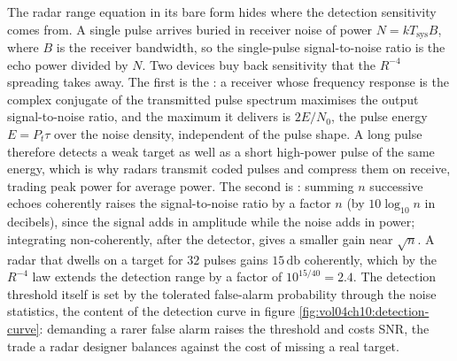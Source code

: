 \begin{mastery}
The radar range equation in its bare form hides where the detection
sensitivity comes from. A single pulse arrives buried in receiver noise
of power $N = k T_{\mathrm{sys}} B$, where $B$ is the receiver bandwidth,
so the single-pulse signal-to-noise ratio is the echo power divided by
$N$. Two devices buy back sensitivity that the $R^{-4}$ spreading takes
away. The first is the : a receiver whose
frequency response is the complex conjugate of the transmitted pulse
spectrum maximises the output signal-to-noise ratio, and the maximum it
delivers is $2E/N_{0}$, the pulse energy $E = P_{t}\tau$ over the noise
density, independent of the pulse shape. A long pulse therefore detects a
weak target as well as a short high-power pulse of the same energy, which
is why radars transmit coded pulses and compress them on receive, trading
peak power for average power. The second is :
summing $n$ successive echoes coherently raises the signal-to-noise ratio
by a factor $n$ (by $10\log_{10} n$ in decibels), since the signal adds
in amplitude while the noise adds in power; integrating non-coherently,
after the detector, gives a smaller gain near $\sqrt{n}$. A radar that
dwells on a target for $32$ pulses gains $15\,\si{\decibel}$ coherently,
which by the $R^{-4}$ law extends the detection range by a factor of
$10^{15/40} = 2.4$. The detection threshold itself is set by the
tolerated false-alarm probability through the noise statistics, the
content of the detection curve in figure
\ref{fig:vol04ch10:detection-curve}: demanding a rarer false alarm raises
the threshold and costs SNR, the trade a radar designer balances against
the cost of missing a real target.
\end{mastery}

